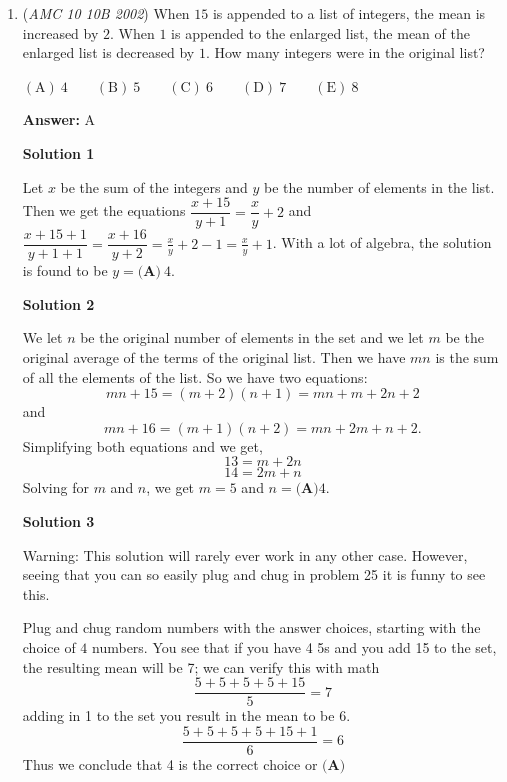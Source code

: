 \begin{enumerate}
 \[10 = -20\cos\left(\frac{\pi}{30}x\right) + 20.\]

 We get to $\frac{1}{2} = \cos\left(\frac{\pi}{30}x\right)$ and remember that the problem is looking for the first instance of $f(x) = 10$, so $\frac{\pi}{30}x = \frac{\pi}{3}.$ Solving, we get that $x = \boxed{\mathrm{(D) \ } 10}$.

 


	\item (\textit{AMC 10 10B 2002}) When $15$ is appended to a list of integers, the mean is increased by $2$. When $1$ is appended to the enlarged list, the mean of the enlarged list is decreased by $1$. How many integers were in the original list?


 $\mathrm{(A) \ } 4\qquad \mathrm{(B) \ } 5\qquad \mathrm{(C) \ } 6\qquad \mathrm{(D) \ } 7\qquad \mathrm{(E) \ } 8$

 \textbf{Answer: }A



\textbf{Solution 1}

Let $x$ be the sum of the integers and $y$ be the number of elements in the list. Then we get the equations $\dfrac{x+15}{y+1}=\dfrac{x}{y}+2$ and $\dfrac{x+15+1}{y+1+1}=\dfrac{x+16}{y+2}=\frac{x}{y}+2-1=\frac{x}{y}+1$. With a lot of algebra, the solution is found to be $y= \boxed{\textbf{(A)}\ 4}$.

 



\textbf{Solution 2}

We let $n$ be the original number of elements in the set and we let $m$ be the original average of the terms of the original list. Then we have $mn$ is the sum of all the elements of the list. So we have two equations: 
 \[mn+15=(m+2)(n+1)=mn+m+2n+2\] and 
 \[mn+16=(m+1)(n+2)=mn+2m+n+2.\]Simplifying both equations and we get,
 \[13=m+2n\]
 \[14=2m+n\]Solving for $m$ and $n$, we get $m=5$ and $n=\boxed{\textbf{(A)}4}$.

 



\textbf{Solution 3}

Warning: This solution will rarely ever work in any other case. However, seeing that you can so easily plug and chug in problem 25 it is funny to see this.

 Plug and chug random numbers with the answer choices, starting with the choice of $4$ numbers. You see that if you have 4 5s and you add 15 to the set, the resulting mean will be 7; we can verify this with math
 \[\frac{5+5+5+5+15}{5}=7\]adding in 1 to the set you result in the mean to be 6.
 \[\frac{5+5+5+5+15+1}{6}=6\]Thus we conclude that 4 is the correct choice or $\boxed{\textbf{(A)}}$





\end{enumerate}
